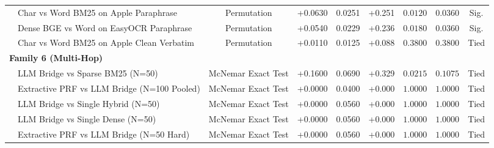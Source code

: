 \begin{table}[t]
\begin{tabular}{@{}llccccccc@{}}
  & Char vs Word BM25 on Apple Paraphrase & Permutation  & +0.0630 & 0.0251 & +0.251 & $0.0120$ & $0.0360$ & Sig. \\
  & Dense BGE vs Word on EasyOCR Paraphrase & Permutation  & +0.0540 & 0.0229 & +0.236 & $0.0180$ & $0.0360$ & Sig. \\
  & Char vs Word BM25 on Apple Clean Verbatim & Permutation  & +0.0110 & 0.0125 & +0.088 & $0.3800$ & $0.3800$ & Tied \\
\multicolumn{9}{l}{\textbf{Family 6 (Multi-Hop)}} \\
  & LLM Bridge vs Sparse BM25 (N=50) & McNemar Exact Test & +0.1600 & 0.0690 & +0.329 & $0.0215$ & $0.1075$ & Tied \\
  & Extractive PRF vs LLM Bridge (N=100 Pooled) & McNemar Exact Test & +0.0000 & 0.0400 & +0.000 & $1.0000$ & $1.0000$ & Tied \\
  & LLM Bridge vs Single Hybrid (N=50) & McNemar Exact Test & +0.0000 & 0.0560 & +0.000 & $1.0000$ & $1.0000$ & Tied \\
  & LLM Bridge vs Single Dense (N=50) & McNemar Exact Test & +0.0000 & 0.0560 & +0.000 & $1.0000$ & $1.0000$ & Tied \\
  & Extractive PRF vs LLM Bridge (N=50 Hard) & McNemar Exact Test & +0.0000 & 0.0560 & +0.000 & $1.0000$ & $1.0000$ & Tied \\
\bottomrule
\end{tabular}
\end{table}
